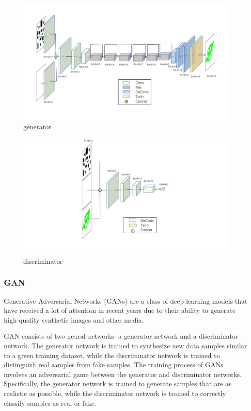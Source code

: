 \documentclass[smallcondensed]{svjour3}     %
\begin{document}
\begin{figure}
\centering
\includegraphics[scale=0.3]{network-CGGenerator.pdf}%
\caption{generator}     
\label{fig:generator}
\end{figure}

\begin{figure}
\centering
\includegraphics[scale=0.3]{network-CGDiscriminator.pdf}%
\caption{discriminator}     
\label{fig:discriminator}
\end{figure}


\subsubsection{GAN}
Generative Adversarial Networks (GANs) are a class of deep learning models that have received a lot of attention in recent years due to their ability to generate high-quality synthetic images and other media. 

GAN consists of two neural networks: a generator network and a discriminator network. 
The generator network is trained to synthesize new data samples similar to a given training dataset, while the discriminator network is trained to distinguish real samples from fake samples.
The training process of GANs involves an adversarial game between the generator and discriminator networks. 
Specifically, the generator network is trained to generate samples that are as realistic as possible, while the discriminator network is trained to correctly classify samples as real or fake. 
\end{document}
